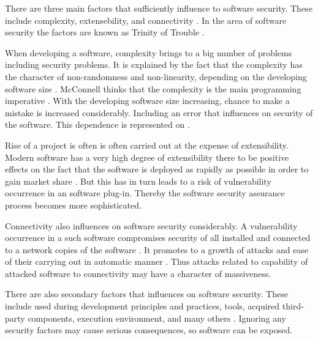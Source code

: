 %
There are three main factors that sufficiently influence to software security. 
%
These include complexity, extensebility, and connectivity . 
%
In the area of software security the factors are known as Trinity of Trouble . 

%
When developing a software, complexity brings to a big number of problems including security problems. 
%
It is explained by the fact that the complexity has the character of non-randomness and non-linearity, depending on the developing software size . 
%
McConnell thinks that the complexity is the main programming imperative . 
%
With the developing software size increasing, \A chance to make a mistake is increased considerably. 
%
Including an error that influences on security of the software. 
%
This dependence is represented on . 


%
Rise of a project is often is often carried out at the expense of extensibility. 
%
Modern software has a very high degree of extensibility there to be positive effects on the fact that the software is deployed as rapidly as possible in order to gain market share . 
%
But this has in turn leads to a risk of vulnerability occurrence in an software plug-in. 
%
Thereby the software security assurance process becomes more sophisticated. 

%
Connectivity also influences on software security considerably. 
%
A vulnerability occurrence in a such software compromises security of all installed and connected to a network copies of the software  . 
%
It promotes to a growth of attacks and ease of their carrying out in automatic manner . 
%
Thus attacks related to capability of attacked software to connectivity may have a character of massiveness. 

%
There are also secondary factors that influences on software security. 
%
These include used during development principles and practices, tools, acquired third-party components, execution environment, and many others . 
%
Ignoring any security factors may cause serious consequences, so software can be exposed. 